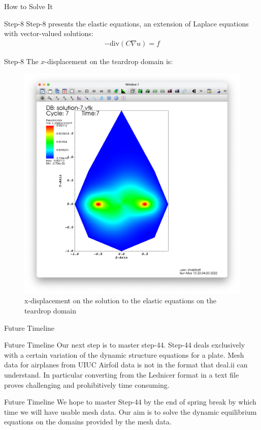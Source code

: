 \documentclass{beamer}
\begin{document}
\begin{section}{How to Solve It}
\begin{frame}{Step-8}
    Step-8 presents the elastic equations, an extension of Laplace equations with vector-valued solutions:
    \begin{align}
        -\text{div}(C \nabla u) = f
    \end{align}
\end{frame}
\begin{frame}{Step-8}
    The $x$-displacement on the teardrop domain is:
    \begin{figure}
        \includegraphics[scale=0.18]{xdisp.png}
        \caption{x-displacement on the solution to the elastic equations on the teardrop domain}
    \end{figure}
\end{frame}
\end{section}
\begin{section}{Future Timeline}
\begin{frame}{Future Timeline}
    Our next step is to master step-44. Step-44 deals exclusively with a certain variation of the dynamic structure equations for a plate. 
    \newline
    \newline
    Mesh data for airplanes from UIUC Airfoil data is not in the format that deal.ii can understand. In particular converting from the Lednicer format in a text file proves challenging and prohibitively time consuming. 
\end{frame}
\begin{frame}{Future Timeline}
    We hope to master Step-44 by the end of spring break by which time we will have usable mesh data. 
    Our aim is to solve the dynamic equilibrium equations on the domains provided by the mesh data.
\end{frame}
\end{section}
\end{document}
